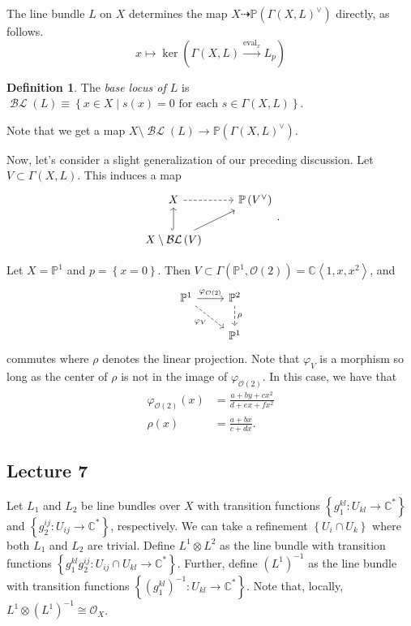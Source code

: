\documentclass[10pt,letterpaper,cm]{nupset}
\theoremstyle{definition}
\newtheorem{defn}{Definition}[subsection]
\theoremstyle{theorem}
\theoremstyle{remark}
\newcommand{\C}{\mathbb C}
\renewcommand{\O}{\mathcal O}
\renewcommand{\P}{\mathbb P}
\newcommand{\1}{\mathbb{1}}
\newcommand{\0}{\vec 0}
\DeclareMathOperator{\ev}{eval}
\DeclareMathOperator{\BL}{\mathcal{BL}}
\begin{document}
The line bundle $L$ on $X$ determines the map $X \dashrightarrow \P\left(\Gamma\left(X, L\right)^{\vee}\right)$ directly, as follows.
\[
x\mapsto \ker\left(\Gamma\left(X, L\right) \overset{\ev_x}{\longrightarrow} L_p\right)
\]

\begin{defn}
The \textit{base locus of $L$} is $\BL\left(L\right) \equiv \left\{x  \in X \mid s(x) =0 \text{ for each } s\in \Gamma\left(X, L\right)\right\}$.
\end{defn} 

Note that we get a map $X \setminus \BL\left(L\right) \to \P\left(\Gamma\left(X, L\right)^{\vee}\right)$.

\bigskip

Now, let's consider a slight generalization of our preceding discussion. Let $V \subset \Gamma\left(X, L\right)$. This induces a map 
\[
\begin{tikzcd}
X \arrow[r, dashed]                                    & \P\left(V^{\vee}\right) \\
X\setminus\BL\left(V\right) \arrow[u, hook] \arrow[ru] &                        
\end{tikzcd}.
\]

Let $X = \P^1$ and $p = \left\{x=0\right\}$. Then $V \subset \Gamma\left(\P^1, \O(2)\right) = \C\left\langle 1, x, x^2\right\rangle$, and
\[
\begin{tikzcd}
\P^1 \arrow[rd, "\varphi_V"', dashed] \arrow[r, "\varphi_{\O(2)}"] & \P^2 \arrow[d, "\rho", dashed] \\
                                                                   & \P^1                       
\end{tikzcd}
\] commutes where $\rho$ denotes the linear projection. Note that $\varphi_V$ is a morphism so long as the center of $\rho$ is not in the image of $\varphi_{\O(2)}$. In this case, we have that
\begin{align*}
\varphi_{\O(2)}(x) & = \frac{a +by + cx^2}{d + ex +fx^2}
\\  \rho(x) & = \frac{a+bx}{c+dx}.
\end{align*}

\subsection{Lecture 7}

Let $L_1$ and $L_2 $ be line bundles over $X$ with transition functions $\left\{g_1^{k{l}} : U_{k{l}} \to \C^{\ast}\right\}$ and $\left\{g_2^{i{j}} : U_{i{j}} \to \C^{\ast}\right\}$, respectively. We can take a refinement $\left\{U_{i} \cap U_k\right\}$ where both $L_1$ and $L_2$ are trivial.  Define $L^1 \otimes L^2$ as the line bundle with transition functions $\left\{g_1^{k{l}}g_2^{i{j}} : U_{ij} \cap U_{k{l}} \to \C^{\ast}\right\}$. Further, define $\left(L^1\right)^{-1}$ as the line bundle with transition functions $\left\{\left(g_1^{k{l}}\right)^{-1} : U_{k{l}} \to \C^{\ast}\right\}$. Note that, locally, $L^1 \otimes \left(L^1\right)^{-1} \cong \O_X$.
\end{document}
